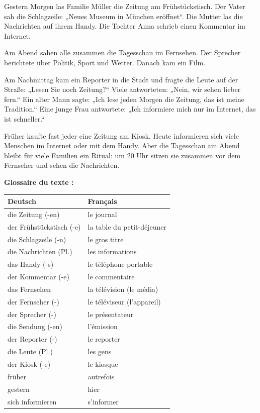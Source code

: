 \documentclass[11pt]{article}
\begin{document}
\begin{textebox}
Gestern Morgen las Familie Müller die Zeitung am Frühstückstisch. Der Vater sah die Schlagzeile: „Neues Museum in München eröffnet“. Die Mutter las die Nachrichten auf ihrem Handy. Die Tochter Anna schrieb einen Kommentar im Internet.

Am Abend sahen alle zusammen die Tagesschau im Fernsehen. Der Sprecher berichtete über Politik, Sport und Wetter. Danach kam ein Film.

Am Nachmittag kam ein Reporter in die Stadt und fragte die Leute auf der Straße: „Lesen Sie noch Zeitung?“ Viele antworteten: „Nein, wir sehen lieber fern.“ Ein alter Mann sagte: „Ich lese jeden Morgen die Zeitung, das ist meine Tradition.“ Eine junge Frau antwortete: „Ich informiere mich nur im Internet, das ist schneller.“

Früher kaufte fast jeder eine Zeitung am Kiosk. Heute informieren sich viele Menschen im Internet oder mit dem Handy. Aber die Tagesschau am Abend bleibt für viele Familien ein Ritual: um 20 Uhr sitzen sie zusammen vor dem Fernseher und sehen die Nachrichten.
\end{textebox}

\textbf{Glossaire du texte :}

\begin{center}
\begin{tabularx}{\linewidth}{|X|X|}
\hline
\rowcolor{popblueL} \textbf{Deutsch} & \textbf{Français} \\
\hline
die Zeitung (-en) & le journal \\
\hline
der Frühstückstisch (-e) & la table du petit-déjeuner \\
\hline
die Schlagzeile (-n) & le gros titre \\
\hline
die Nachrichten (Pl.) & les informations \\
\hline
das Handy (-s) & le téléphone portable \\
\hline
der Kommentar (-e) & le commentaire \\
\hline
das Fernsehen & la télévision (le média) \\
\hline
der Fernseher (-) & le téléviseur (l'appareil) \\
\hline
der Sprecher (-) & le présentateur \\
\hline
die Sendung (-en) & l'émission \\
\hline
der Reporter (-) & le reporter \\
\hline
die Leute (Pl.) & les gens \\
\hline
der Kiosk (-e) & le kiosque \\
\hline
früher & autrefois \\
\hline
gestern & hier \\
\hline
sich informieren & s'informer \\
\hline
\end{tabularx}
\end{center}
\end{document}
